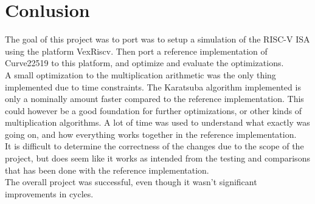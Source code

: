 \section{Conlusion}
The goal of this project was to port was to setup a simulation of the RISC-V ISA using the platform
VexRiscv. Then port a reference implementation of Curve22519 to this platform, and optimize and evaluate the optimizations. \\
A small optimization to the multiplication arithmetic was the only thing implemented due to time constraints. The Karatsuba algorithm implemented is only a nominally amount faster compared to the reference implementation. This could however be a good foundation for further optimizations, or other kinds of multiplication algorithms. A lot of time was used to understand what exactly was going on, and how everything works together in the reference implementation.\\
It is difficult to determine the correctness of the changes due to the scope of the project, but does seem like it works as intended from the testing and comparisons that has been done with the reference implementation.\\
The overall project was successful, even though it wasn't significant improvements in cycles.
